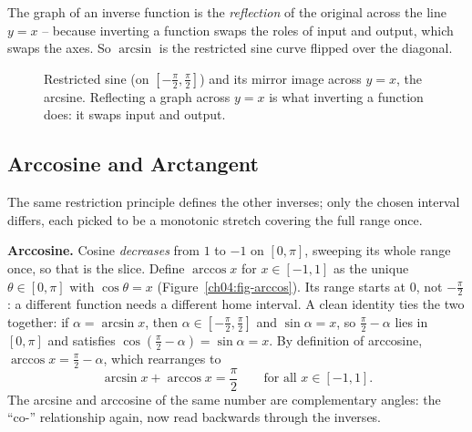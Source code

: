 The graph of an inverse function is the \emph{reflection} of the original across the line $y=x$ -- because inverting a function swaps the roles of input and output, which swaps the axes. So $\arcsin$ is the restricted sine curve flipped over the diagonal.

\begin{figure}[htbp]
\centering
{}
\caption{Restricted sine (on $[-\tfrac\pi2,\tfrac\pi2]$) and its mirror image across $y=x$, the arcsine. Reflecting a graph across $y=x$ is what inverting a function does: it swaps input and output.}
\label{ch04:fig-arcsin}
\end{figure}

\subsection{Arccosine and Arctangent}

The same restriction principle defines the other inverses; only the chosen interval differs, each picked to be a monotonic stretch covering the full range once.

\textbf{Arccosine.} Cosine \emph{decreases} from $1$ to $-1$ on $[0,\pi]$, sweeping its whole range once, so that is the slice. Define $\arccos x$ for $x\in[-1,1]$ as the unique $\theta\in[0,\pi]$ with $\cos\theta = x$ (Figure~\ref{ch04:fig-arccos}). Its range starts at $0$, not $-\tfrac\pi2$: a different function needs a different home interval. A clean identity ties the two together: if $\alpha = \arcsin x$, then $\alpha\in[-\tfrac\pi2,\tfrac\pi2]$ and $\sin\alpha = x$, so $\tfrac\pi2 - \alpha$ lies in $[0,\pi]$ and satisfies $\cos(\tfrac\pi2 - \alpha) = \sin\alpha = x$. By definition of arccosine, $\arccos x = \tfrac\pi2 - \alpha$, which rearranges to
\[
  \arcsin x + \arccos x = \frac{\pi}{2}\qquad\text{for all }x\in[-1,1].
\]
The arcsine and arccosine of the same number are complementary angles: the ``co-'' relationship again, now read backwards through the inverses.

